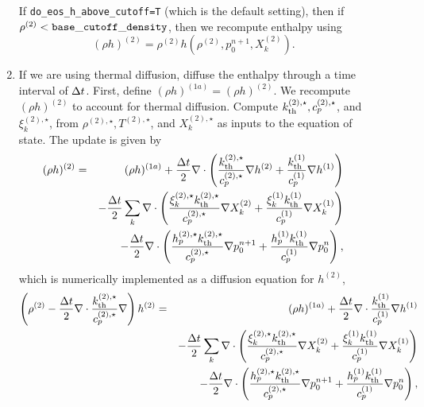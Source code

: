 \begin{description}
\begin{enumerate}
\begin{enumerate}
\begin{description}
\end{description}

\end{enumerate}

If {\tt do\_eos\_h\_above\_cutoff=T} (which is the default setting), then if
$\rho^{(2)} < {\tt base\_cutoff\_density}$, then we recompute enthalpy using
\begin{equation}
(\rho h)^{(2)} = \rho^{(2)}h\left(\rho^{(2)},p_0^{n+1},X_k^{(2)}\right).
\end{equation}

\item If we are using thermal diffusion, diffuse the enthalpy through a time interval of 
$\Delta t$.  First, define $(\rho h)^{(1a)} = (\rho h)^{(2)}$.  We recompute $(\rho h)^{(2)}$ to 
account for thermal diffusion.  Compute $k_{\rm th}^{(2),\star}, c_p^{(2),\star}$, and 
$\xi_k^{(2),\star}$, from $\rho^{(2),\star}, T^{(2),\star}$, and $X_k^{(2),\star}$ as inputs to 
the equation of state.  The update is given by
\begin{eqnarray}
(\rho h)^{(2)} &=& (\rho h)^{(1a)} + \frac{\Delta t}{2}\nabla\cdot\left(\frac{k_{\rm th}^{(2),\star}}{c_p^{(2),\star}}\nabla h^{(2)} + \frac{k_{\rm th}^{(1)}}{c_p^{(1)}}\nabla h^{(1)}\right)\nonumber\\
&&- \frac{\Delta t}{2}\sum_k\nabla\cdot\left(\frac{\xi_k^{(2),\star}k_{\rm th}^{(2),\star}}{c_p^{(2),\star}}\nabla X_k^{(2)} + \frac{\xi_k^{(1)}k_{\rm th}^{(1)}}{c_p^{(1)}}\nabla X_k^{(1)}\right)\nonumber\\
&&- \frac{\Delta t}{2}\nabla\cdot\left(\frac{h_p^{(2),\star}k_{\rm th}^{(2),\star}}{c_p^{(2),\star}}\nabla p_0^{n+1} + \frac{h_p^{(1)}k_{\rm th}^{(1)}}{c_p^{(1)}}\nabla p_0^{n}\right),
\end{eqnarray}
which is numerically implemented as a diffusion equation for $h^{(2)}$,
\begin{eqnarray}
\left(\rho^{(2)} - \frac{\dt}{2}\nabla\cdot\frac{\kth^{(2),\star}}{c_p^{(2),\star}}\nabla\right)h^{(2)} &=& (\rho h)^{(1a)} + \frac{\dt}{2}\nabla\cdot\frac{\kth^{(1)}}{c_p^{(1)}}\nabla h^{(1)}\nonumber\\
&&- \frac{\dt}{2}\sum_k\nabla\cdot\left(\frac{\xi_k^{(2),\star}\kth^{(2),\star}}{c_p^{(2),\star}}\nabla X_k^{(2)} + \frac{\xi_k^{(1)}\kth^{(1)}}{c_p^{(1)}}\nabla X_k^{(1)}\right)\nonumber\\
&&- \frac{\dt}{2}\nabla\cdot\left(\frac{h_p^{(2),\star}\kth^{(2),\star}}{c_p^{(2),\star}}\nabla p_0^{n+1} + \frac{h_p^{(1)}\kth^{(1)}}{c_p^{(1)}}\nabla p_0^{n}\right),

\end{eqnarray}
\end{enumerate}
\end{description}
